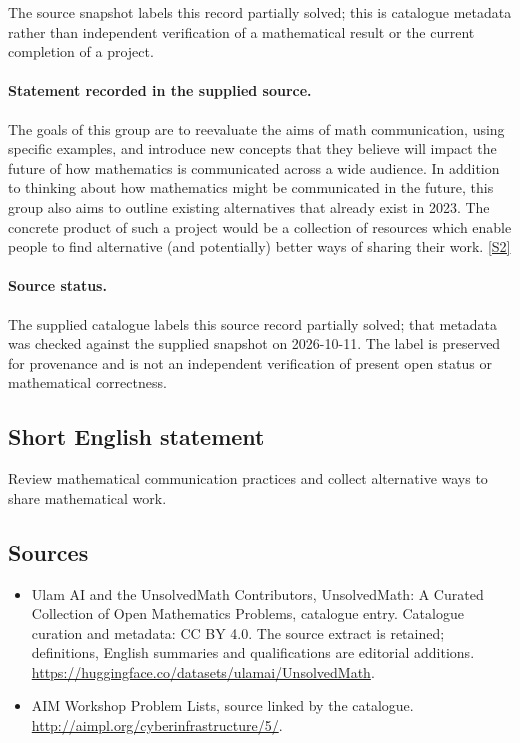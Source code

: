\documentclass[11pt]{article}
\begin{document}
The source snapshot labels this record partially solved; this is catalogue metadata rather than independent verification of a mathematical result or the current completion of a project.
\paragraph{Statement recorded in the supplied source.}
The goals of this group are to reevaluate the aims of math communication, using specific examples, and introduce new concepts that they believe will impact the future of how mathematics is communicated across a wide audience.
In addition to thinking about how mathematics might be communicated in the future, this group also aims to outline existing alternatives that already exist in 2023. The concrete product of such a project would be a collection of resources which enable people to find alternative (and potentially) better ways of sharing their work. \href{http://aimpl.org/cyberinfrastructure/5/}{[S2]}
\paragraph{Source status.}
The supplied catalogue labels this source record partially solved; that metadata was checked against the supplied snapshot on 2026-10-11. The label is preserved for provenance and is not an independent verification of present open status or mathematical correctness.
\subsection{Short English statement}
Review mathematical communication practices and collect alternative ways to share mathematical work.
\subsection{Sources}
\begin{itemize}
\item[S1] Ulam AI and the UnsolvedMath Contributors, UnsolvedMath: A Curated Collection of Open Mathematics Problems, catalogue entry. Catalogue curation and metadata: CC BY 4.0. The source extract is retained; definitions, English summaries and qualifications are editorial additions.
\url{https://huggingface.co/datasets/ulamai/UnsolvedMath}.
\item[S2] AIM Workshop Problem Lists, source linked by the catalogue.
\url{http://aimpl.org/cyberinfrastructure/5/}.
\end{itemize}
\end{document}
